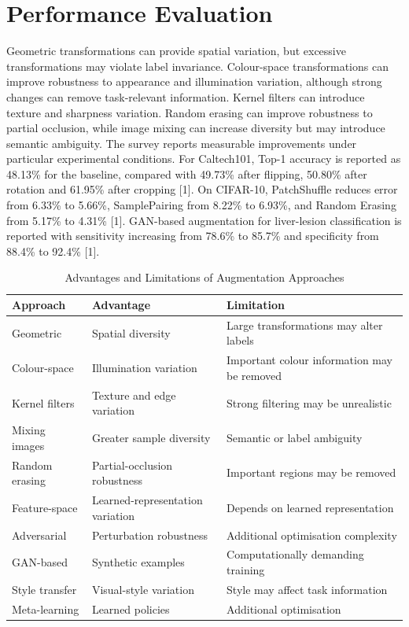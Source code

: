 \documentclass[conference]{IEEEtran}
\begin{document}
\section{Performance Evaluation}
Geometric transformations can provide spatial variation, but excessive transformations may violate label invariance. Colour-space transformations can improve robustness to appearance and illumination variation, although strong changes can remove task-relevant information. Kernel filters can introduce texture and sharpness variation. Random erasing can improve robustness to partial occlusion, while image mixing can increase diversity but may introduce semantic ambiguity.
The survey reports measurable improvements under particular experimental conditions. For Caltech101, Top-1 accuracy is reported as 48.13\% for the baseline, compared with 49.73\% after flipping, 50.80\% after rotation and 61.95\% after cropping [1]. On CIFAR-10, PatchShuffle reduces error from 6.33\% to 5.66\%, SamplePairing from 8.22\% to 6.93\%, and Random Erasing from 5.17\% to 4.31\% [1]. GAN-based augmentation for liver-lesion classification is reported with sensitivity increasing from 78.6\% to 85.7\% and specificity from 88.4\% to 92.4\% [1].
\begin{table}[!t]
\caption{Advantages and Limitations of Augmentation Approaches}
\centering
\scriptsize
\begin{tabular}{lll}
\toprule
\textbf{Approach} & \textbf{Advantage} & \textbf{Limitation}\\
\midrule
Geometric & Spatial diversity & Large transformations may alter labels\\
Colour-space & Illumination variation & Important colour information may be removed\\
Kernel filters & Texture and edge variation & Strong filtering may be unrealistic\\
Mixing images & Greater sample diversity & Semantic or label ambiguity\\
Random erasing & Partial-occlusion robustness & Important regions may be removed\\
Feature-space & Learned-representation variation & Depends on learned representation\\
Adversarial & Perturbation robustness & Additional optimisation complexity\\
GAN-based & Synthetic examples & Computationally demanding training\\
Style transfer & Visual-style variation & Style may affect task information\\
Meta-learning & Learned policies & Additional optimisation\\
\bottomrule
\end{tabular}
\end{table}
\end{document}
